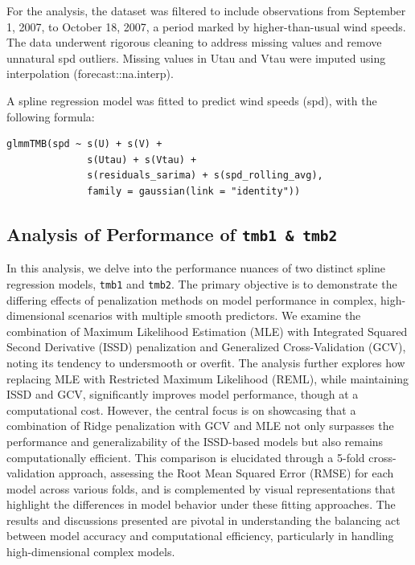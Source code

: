 \documentclass[12pt, twoside,hidelinks]{article}
\theoremstyle{definition}
\numberwithin{equation}{section}
\begin{document}
For the analysis, the dataset was filtered to include observations from September 1, 2007, to October 18, 2007, a period marked by higher-than-usual wind speeds. The data underwent rigorous cleaning to address missing values and remove unnatural spd outliers. Missing values in Utau and Vtau were imputed using interpolation (forecast::na.interp).
\newline

A spline regression model was fitted to predict wind speeds (spd), with the following formula:
\begin{verbatim}
glmmTMB(spd ~ s(U) + s(V) + 
              s(Utau) + s(Vtau) + 
              s(residuals_sarima) + s(spd_rolling_avg),
              family = gaussian(link = "identity"))
\end{verbatim}


\subsection{Analysis of Performance of \texttt{tmb1 \& tmb2}}

In this analysis, we delve into the performance nuances of two distinct spline regression models, \texttt{tmb1} and \texttt{tmb2}. The primary objective is to demonstrate the differing effects of penalization methods on model performance in complex, high-dimensional scenarios with multiple smooth predictors. We examine the combination of Maximum Likelihood Estimation (MLE) with Integrated Squared Second Derivative (ISSD) penalization and Generalized Cross-Validation (GCV), noting its tendency to undersmooth or overfit\cite{wood2020inference}. The analysis further explores how replacing MLE with Restricted Maximum Likelihood (REML), while maintaining ISSD and GCV, significantly improves model performance\cite{wood2020inference}, though at a computational cost. However, the central focus is on showcasing that a combination of Ridge penalization with GCV and MLE not only surpasses the performance and generalizability of the ISSD-based models but also remains computationally efficient. This comparison is elucidated through a 5-fold cross-validation approach, assessing the Root Mean Squared Error (RMSE) for each model across various folds, and is complemented by visual representations that highlight the differences in model behavior under these fitting approaches. The results and discussions presented are pivotal in understanding the balancing act between model accuracy and computational efficiency, particularly in handling high-dimensional complex models.
\end{document}
